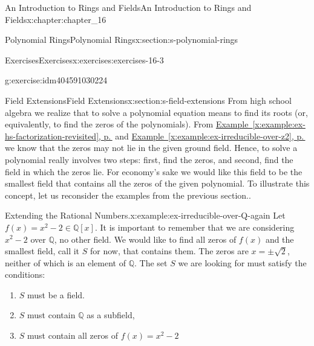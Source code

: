 \documentclass[twoside,10pt,]{book}
\newcommand{\xreffont}{\relax}
\numberwithin{equation}{section}
\begin{document}
\begin{chapterptx}{An Introduction to Rings and Fields}{}{An Introduction to Rings and Fields}{}{}{x:chapter:chapter_16}
\begin{sectionptx}{Polynomial Rings}{}{Polynomial Rings}{}{}{x:section:s-polynomial-rings}
\begin{exercises-subsection}{Exercises}{}{Exercises}{}{}{x:exercises:exercises-16-3}
\begin{divisionexercise}{12}{}{}{g:exercise:idm404591030224}
\begin{enumerate}[label=(\alph*)]
\end{enumerate}
%
\end{divisionexercise}%
\end{exercises-subsection}
\end{sectionptx}
%
%
\typeout{************************************************}
\typeout{************************************************}
%
\begin{sectionptx}{Field Extensions}{}{Field Extensions}{}{}{x:section:s-field-extensions}
From high school algebra we realize that to solve a polynomial equation means to find its roots (or, equivalently, to find the zeros of the polynomials). From \hyperref[x:example:ex-hs-factorization-revisited]{Example~{\xreffont\ref{x:example:ex-hs-factorization-revisited}}, p.\,\pageref{x:example:ex-hs-factorization-revisited}} and \hyperref[x:example:ex-irreducible-over-z2]{Example~{\xreffont\ref{x:example:ex-irreducible-over-z2}}, p.\,\pageref{x:example:ex-irreducible-over-z2}} we know that the zeros may not lie in the given ground field. Hence, to solve a polynomial really involves two steps: first, find the zeros, and second, find the field in which the zeros lie. For economy's sake we would like this field to be the smallest field that contains all the zeros of the given polynomial. To illustrate this concept, let us reconsider the examples from the previous section..%
\begin{example}{Extending the Rational Numbers.}{x:example:ex-irreducible-over-Q-again}%
Let \(f(x)=x^2 - 2 \in  \mathbb{Q}[x]\). It is important to remember that we are considering \(x^2-2\) over \(\mathbb{Q}\), no other field. We would like to find all zeros of \(f(x)\) and the smallest field, call it \(S\) for now, that contains them. The zeros are \(x= \pm \sqrt{2}\), neither of which is an element of \(\mathbb{Q}\). The set \(S\) we are looking for must satisfy the conditions:%
\begin{enumerate}[label=(\arabic*)]
\item{}\(S\) must be a field.%
\item{}\(S\) must contain \(\mathbb{Q}\) as a subfield,%
\item{}\(S\) must contain all zeros of \(f(x)=x^2 - 2\)%
\end{enumerate}
%
\par

\end{example}
\end{sectionptx}
\end{chapterptx}
\end{document}
